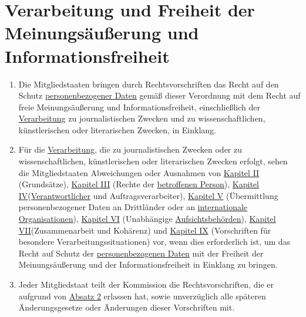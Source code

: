 \chapter{Verarbeitung und Freiheit der Meinungsäußerung und Informationsfreiheit}
\label{ch:85}


\begin{enumerate}

  \item Die Mitgliedstaaten bringen durch Rechtsvorschriften das Recht auf den Schutz \hyperref[itm:04-1]{personenbezogener Daten} gemäß
   dieser Verordnung mit dem Recht auf freie Meinungsäußerung und Informationsfreiheit, einschließlich der \hyperref[itm:04-2]{Verarbeitung}
   zu journalistischen Zwecken und zu wissenschaftlichen, künstlerischen oder literarischen Zwecken, in Einklang.
  \label{itm:85-1}

  \item Für die \hyperref[itm:04-2]{Verarbeitung}, die zu journalistischen Zwecken oder zu wissenschaftlichen, künstlerischen oder
   literarischen Zwecken erfolgt, sehen die Mitgliedstaaten Abweichungen oder Ausnahmen von \hyperref[part:2]
   {Kapitel II} (Grundsätze), \hyperref[part:3]{Kapitel III} (Rechte der \hyperref[itm:04-1]{betroffenen Person}), \hyperref[part:4]
   {Kapitel IV}(\hyperref[itm:04-7]{Verantwortlicher} und Auftragsverarbeiter), \hyperref[part:5]{Kapitel V} (Übermittlung personenbezogener
   Daten an Drittländer oder an \hyperref[itm:04-29]{internationale Organisationen}), \hyperref[part:6]{Kapitel VI}
   (Unabhängige \hyperref[itm:04-21]{Aufsichtsbehörden}), \hyperref[part:7]{Kapitel VII}(Zusammenarbeit und Kohärenz) und \hyperref[part:9]
   {Kapitel IX} (Vorschriften für besondere Verarbeitungssituationen) vor, wenn dies erforderlich ist, um das Recht auf
   Schutz der \hyperref[itm:04-1]{personenbezogenen Daten} mit der Freiheit der Meinungsäußerung und der Informationsfreiheit in Einklang zu
   bringen.
  \label{itm:85-2}

  \item Jeder Mitgliedstaat teilt der Kommission die Rechtsvorschriften, die er aufgrund von \hyperref[itm:85-2]
   {Absatz 2} erlassen hat, sowie unverzüglich alle späteren Änderungsgesetze oder Änderungen dieser Vorschriften mit.
  \label{itm:85-3}

\end{enumerate}


